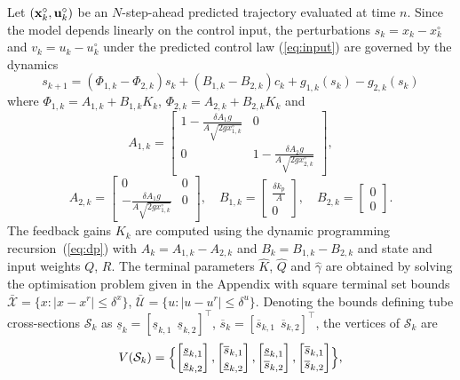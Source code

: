 \documentclass[a4paper, 10 pt, conference]{IEEEconf}
\def\S{\mathcal{S}}
\def\U{\mathcal{U}}
\def\X{\mathcal{X}}
\begin{document}
Let $({\bf x}_k^\circ, {\bf u}_k^\circ)$ be an $N$-step-ahead predicted trajectory evaluated at time $n$. Since the model depends linearly on the control input, the perturbations $s_k = x_k - x_k^\circ$ and $v_k = u_k - u_k^\circ$ under the predicted control law (\ref{eq:input}) are governed by the dynamics
 \[
 s_{k+1} = (\Phi_{1, k}- \Phi_{2, k}) s_k + (B_{1,k} - B_{2,k}) c_k + g_{1, k}(s_k) -  g_{2, k}(s_k)
 \]
 where $\Phi_{1, k} = A_{1, k} + B_{1, k} K_{k} $, $\Phi_{2, k} = A_{2, k} +  B_{2, k} K_{k}$ and
\[
A_{1, k} = \begin{bmatrix}
     1 - \frac{\delta A_1 g}{A \sqrt{2 g x_{1, k}^\circ}}   & 0\\
      0 & 1 - \frac{\delta A_2 g}{A \sqrt{2 g x_{2, k}^\circ}}
\end{bmatrix},
\]
\[
A_{2, k} = \begin{bmatrix}
     0  & 0\\
      - \frac{\delta A_1 g}{A \sqrt{2 g x_{1, k}^\circ}}  & 0
\end{bmatrix}, \quad 
B_{1, k} = \begin{bmatrix}
     \frac{\delta k_p}{A}\\
     0
\end{bmatrix}, \quad
B_{2, k} = \begin{bmatrix}
     0\\
     0
\end{bmatrix}. 
\]
The feedback gains $K_k$ are computed using the dynamic programming recursion~(\ref{eq:dp}) with $A_k = A_{1, k}-A_{2, k}$ and $B_k=B_{1, k}-B_{2, k}$ and state and input weights $Q$, $R$.
The terminal parameters $\hat{K}$, $\hat{Q}$ and $\hat{\gamma}$ are obtained by solving the optimisation problem given in the Appendix with square terminal set bounds $\bar{\X} = \{x : \lvert x-x^r \rvert \leq \delta^x\}$, $\bar{\U} = \{u : \lvert u-u^r \rvert \leq \delta^u\}$.
%
Denoting the bounds defining tube cross-sections $\S_k$ as $\underline{s}_k = [\underline{s}_{k,1} \ \ \underline{s}_{k,2}]^\top$,
$\overline{s}_k = [\overline{s}_{k,1} \ \ \overline{s}_{k,2}]^\top$,
the vertices of $\S_k$ are
\[V(\S_k) = \Bigl\{ \begin{bmatrix} \underline{s}_{k, 1}\\ \underline{s}_{k, 2} \end{bmatrix}, \begin{bmatrix} \overline{s}_{k, 1}\\ \underline{s}_{k, 2} \end{bmatrix}, \begin{bmatrix} \underline{s}_{k, 1}\\ \overline{s}_{k, 2} \end{bmatrix}, \begin{bmatrix} \overline{s}_{k, 1}\\ \overline{s}_{k, 2} \end{bmatrix}\Bigr\}, 
\] 
\end{document}
